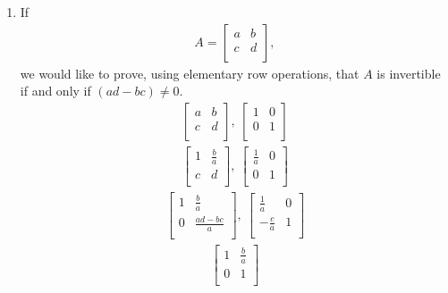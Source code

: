\documentclass[12pt]{article}
\begin{document}
\begin{enumerate}
  \item
    If
    \begin{align*}
      A =
      \begin{bmatrix}
        a & b\\
        c & d\\
      \end{bmatrix},
    \end{align*}
    we would like to prove, using elementary row operations, that
    $A$ is invertible if and only if $(ad - bc) \neq 0$.
    \begin{align*}
      \begin{bmatrix}
        a & b\\
        c & d\\
      \end{bmatrix},\
      \begin{bmatrix}
        1 & 0\\
        0 & 1\\
      \end{bmatrix}
    \end{align*}
    \begin{align*}
      \begin{bmatrix}
        1 & \frac{b}{a}\\
        c & d\\
      \end{bmatrix},\
      \begin{bmatrix}
        \frac{1}{a} & 0\\
        0 & 1\\
      \end{bmatrix}
    \end{align*}
    \begin{align*}
      \begin{bmatrix}
        1 & \frac{b}{a}\\
        0 & \frac{ad - bc}{a}\\
      \end{bmatrix},\
      \begin{bmatrix}
        \frac{1}{a} & 0\\
        -\frac{c}{a} & 1\\
      \end{bmatrix}
    \end{align*}
    \begin{align*}
      \begin{bmatrix}
        1 & \frac{b}{a}\\
        0 & 1\\

\end{bmatrix}
\end{align*}
\end{enumerate}
\end{document}

